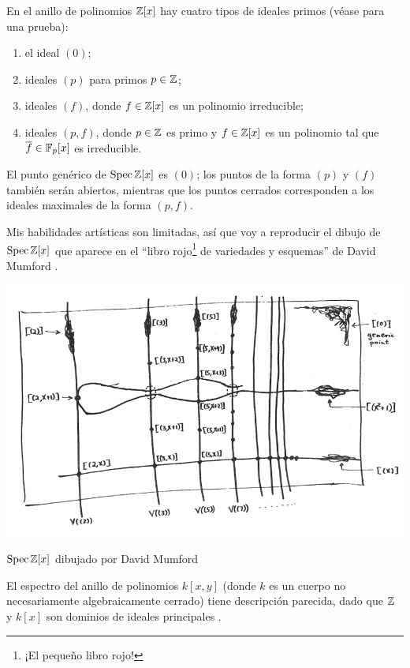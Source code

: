 \documentclass{article}
\numberwithin{equation}{section}
\theoremstyle{definition}
\begin{document}
\begin{ejemplo}
  En el anillo de polinomios $\mathbb{Z} [x]$ hay cuatro tipos de ideales primos (véase
  \cite[\S 1.5]{Reid-UCA} para una prueba):
  \begin{enumerate}
  \item[0)] el ideal $(0)$;

  \item[1)] ideales $(p)$ para primos $p \in \mathbb{Z}$;

  \item[2)] ideales $(f)$, donde $f \in \mathbb{Z}[x]$ es un polinomio irreducible;

  \item[3)] ideales $(p,f)$, donde $p \in \mathbb{Z}$ es primo y $f \in \mathbb{Z}[x]$ es
    un polinomio tal que $\overline{f} \in \mathbb{F}_p [x]$ es irreducible.
  \end{enumerate}

  El punto genérico de $\operatorname{Spec} \mathbb{Z} [x]$ es $(0)$; los puntos de la forma $(p)$
  y $(f)$ también serán abiertos, mientras que los puntos cerrados corresponden
  a los ideales maximales de la forma $(p,f)$.

  Mis habilidades artísticas son limitadas, así que voy a reproducir el dibujo
  de $\operatorname{Spec} \mathbb{Z}[x]$ que aparece en el ``libro rojo\footnote{¡El pequeño libro
    rojo!} de variedades y esquemas'' de David Mumford \cite{Mumford-Red-Book}.

  \begin{center}
    \includegraphics[width=16cm]{mumford.png}

    $\operatorname{Spec} \mathbb{Z}[x]$ dibujado por David Mumford
  \end{center}

  El espectro del anillo de polinomios $k[x,y]$ (donde $k$ es un cuerpo no
  necesariamente algebraicamente cerrado) tiene descripción parecida, dado que
  $\mathbb{Z}$ y $k [x]$ son dominios de ideales principales \cite[\S 1.5]{Reid-UCA}.
\end{ejemplo}
\end{document}
